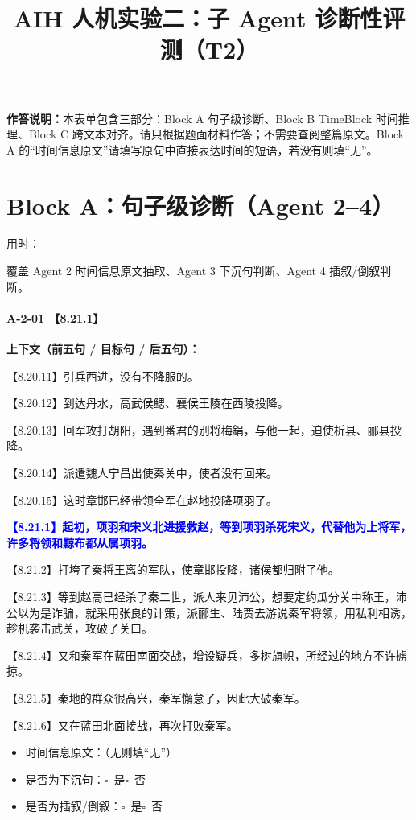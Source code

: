 \documentclass[fontset=none,11pt,a4paper]{ctexart}
\title{\textbf{AIH 人机实验二：子 Agent 诊断性评测（T2）}}
\author{}
\date{}
\newcommand{\answerline}[1]{\underline{\hspace{#1}}}
\newcommand{\choicebox}[1]{$\square$~#1}
\newcommand{\blocktime}{\vspace{0.25em}\noindent 用时：\answerline{4cm}\par\vspace{0.6em}}
\begin{document}
\maketitle
\vspace{-2em}

\textbf{作答说明：}本表单包含三部分：Block A 句子级诊断、Block B TimeBlock 时间推理、Block C 跨文本对齐。请只根据题面材料作答；不需要查阅整篇原文。Block A 的“时间信息原文”请填写原句中直接表达时间的短语，若没有则填“无”。

\section{Block A：句子级诊断（Agent 2--4）}
\blocktime
覆盖 Agent 2 时间信息原文抽取、Agent 3 下沉句判断、Agent 4 插叙/倒叙判断。

\paragraph{A-2-01 \quad 【8.21.1】}
\textbf{上下文（前五句 / 目标句 / 后五句）：}

\noindent 【8.20.11】引兵西进，没有不降服的。\par
\noindent 【8.20.12】到达丹水，高武侯鳃、襄侯王陵在西陵投降。\par
\noindent 【8.20.13】回军攻打胡阳，遇到番君的别将梅鋗，与他一起，迫使析县、郦县投降。\par
\noindent 【8.20.14】派遣魏人宁昌出使秦关中，使者没有回来。\par
\noindent 【8.20.15】这时章邯已经带领全军在赵地投降项羽了。\par
\noindent \textcolor{blue}{\textbf{【8.21.1】起初，项羽和宋义北进援救赵，等到项羽杀死宋义，代替他为上将军，许多将领和黥布都从属项羽。}}\par
\noindent 【8.21.2】打垮了秦将王离的军队，使章邯投降，诸侯都归附了他。\par
\noindent 【8.21.3】等到赵高已经杀了秦二世，派人来见沛公，想要定约瓜分关中称王，沛公以为是诈骗，就采用张良的计策，派郦生、陆贾去游说秦军将领，用私利相诱，趁机袭击武关，攻破了关口。\par
\noindent 【8.21.4】又和秦军在蓝田南面交战，增设疑兵，多树旗帜，所经过的地方不许掳掠。\par
\noindent 【8.21.5】秦地的群众很高兴，秦军懈怠了，因此大破秦军。\par
\noindent 【8.21.6】又在蓝田北面接战，再次打败秦军。\par

\begin{itemize}
  \item 时间信息原文：\answerline{7.5cm}（无则填“无”）
  \item 是否为下沉句：\choicebox{是}\quad \choicebox{否}
  \item 是否为插叙/倒叙：\choicebox{是}\quad \choicebox{否}
\end{itemize}
\end{document}
